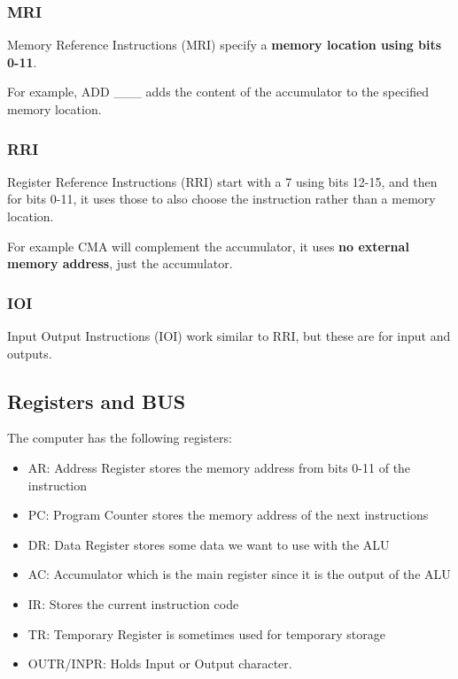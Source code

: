 \documentclass[12pt,letterpaper]{article} \usepackage{amsmath} \usepackage{graphicx} \usepackage[margin=1in]{geometry} \usepackage{longtable}  \usepackage{amssymb}
\begin{document}
			
				\subsubsection{MRI}
				Memory Reference Instructions (MRI) specify a \textbf{memory location using bits 0-11}. 
				
				For example, ADD \_\_\_ adds the content of the accumulator to the specified memory location. 
				
				\subsubsection{RRI}
				Register Reference Instructions (RRI) start with a 7 using bits 12-15, and then for bits 0-11, it uses those to also choose the instruction rather than a memory location.
				
				For example CMA will complement the accumulator, it uses\textbf{ no external memory address}, just the accumulator.
				
				\subsubsection{IOI}
				Input Output Instructions (IOI) work similar to RRI, but these are for input and outputs. 
			
			\subsection{Registers and BUS}
			The computer has the following registers:
			
			\begin{itemize}[noitemsep]
				\item AR: Address Register stores the memory address from bits 0-11 of the instruction
				\item PC: Program Counter stores the memory address of the next instructions
				\item DR: Data Register stores some data we want to use with the ALU
				\item AC: Accumulator which is the main register since it is the output of the ALU
				\item IR: Stores the current instruction code
				\item TR: Temporary Register is sometimes used for temporary storage
				\item OUTR/INPR: Holds Input or Output character.
			\end{itemize}
			
\end{document}
